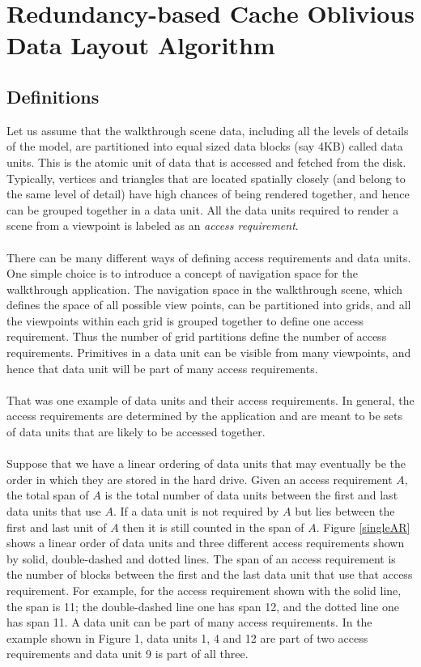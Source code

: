 
\section{Redundancy-based Cache Oblivious Data Layout Algorithm}


\subsection{Definitions}

Let us assume that the walkthrough scene data, including all the levels of
details of the model, are partitioned into equal sized data blocks (say 4KB)
called data units. This is the atomic unit of data that is accessed and fetched
from the disk. Typically, vertices and triangles that are located spatially
closely (and belong to the same level of detail) have high chances of being
rendered together, and hence can be grouped together in a data unit. All the
data units required to render a scene from a viewpoint is labeled as an {\em
access requirement}. \\
\\
There can be many different ways of defining access requirements and data
units. One simple choice is to introduce a concept of navigation space for the
walkthrough application.
The navigation space in the walkthrough scene, which defines the space of all
possible view points, can be partitioned into grids,  and all the viewpoints
within each grid is grouped together to define one access requirement. Thus the
number of grid partitions define the number of access requirements. Primitives
in a data unit can be visible from many viewpoints, and hence that data unit
will be part of many access requirements. \\
\\
That was one example of data units and their access requirements. In general,
the access requirements are determined by the application and are meant to be
sets of data units that are likely to be accessed together. \\
\\
Suppose that we have a linear ordering of data units that may eventually be the
order in which they are stored in the hard drive.  Given an access requirement
$A$, the total span of $A$ is the total number of data units between the first
and last data units that use $A$. If a data unit is not required by $A$ but
lies between the first and last unit of $A$ then it is still counted in the
span of $A$. Figure \ref{singleAR} shows a linear order of data units and three
different access requirements shown by solid, double-dashed and dotted lines.
The span of an access requirement is the number of blocks between the first and
the last data unit that use that access requirement. For example, for the
access requirement shown with the solid line, the span is 11; the double-dashed
line one has span 12, and the dotted line one has span 11. A data unit can be
part of many access requirements. In the example shown in Figure 1, data units
1, 4 and 12 are part of two access requirements and data unit 9 is part of all
three. \\ \\

